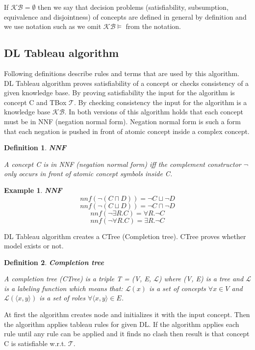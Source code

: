 \documentclass[12pt,a4paper]{article}
\newtheorem{definition}{Definition}[subsection]
\newtheorem{example}{Example}[subsection]
\begin{document}
If $\mathcal{KB} = \emptyset$ then we say that decision problems (satisfiability, subsumption, equivalence and disjointness) of concepts are defined in general by definition and we use notation such as we omit $\mathcal{KB} \models$ from the notation.

\subsection{DL Tableau algorithm}
Following definitions \citep{baaderHandbook} describe rules and terms that are used by this algorithm. DL Tableau algorithm proves satisfiability of a concept or checks consistency of a given knowledge base. By proving satisfiability the input for the algorithm is concept C and TBox $\mathcal{T}$. By checking consistency the input for the algorithm is a knowledge base $\mathcal{KB}$. In both versions of this algorithm holds that each concept must be in NNF (negation normal form). Negation normal form is such a form that each negation is pushed in front of atomic concept inside a complex concept. 

\begin{definition}{\textbf{NNF}}
	
	A concept C is in NNF (negation normal form) iff the complement constructor $\neg$ 
	only occurs in front of atomic concept symbols inside C.
\end{definition}

\begin{example}{\textbf{NNF}}
	\[ nnf(\neg (C \sqcap D)) = \neg C \sqcup \neg D \]
	\[ nnf(\neg (C \sqcup D)) = \neg C \sqcap \neg D \]
	\[ nnf(\neg \exists R.C) = \forall R. \neg C \]
	\[ nnf(\neg \forall R.C) = \exists R. \neg C \]
\end{example}

DL Tableau algorithm creates a CTree (Completion tree). CTree proves whether model exists or not.

\begin{definition}{\textbf{Completion tree}}

	A completion tree (CTree) is a triple T = (V, E, $\mathcal{L}$) where (V, E)
	is a tree and $\mathcal{L}$ is a labeling function which means that:
	$\mathcal{L}(x)$ is a set of concepts $\forall x \in V$ and
	$\mathcal{L}(\langle x, y \rangle )$ is a set of roles $\forall \langle x, y \rangle \in E$.	
\end{definition}

At first the algorithm creates node and initializes it with the input concept.
Then the algorithm applies tableau rules for given DL. If the algorithm applies each rule until any rule can be applied and it finds no clash then result is that concept C is satisfiable w.r.t. $\mathcal{T}$.
\end{document}
